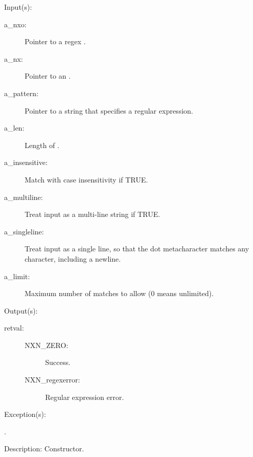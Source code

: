 \begin{capi}
\label{nxo_regex_new}
	\begin{capilist}
	\item[Input(s): ]
		\begin{description}\item[]
		\item[a\_nxo: ]
			Pointer to a regex .
		\item[a\_nx: ]
			Pointer to an .
		\item[a\_pattern: ]
			Pointer to a string that specifies a regular expression.
		\item[a\_len: ]
			Length of .
		\item[a\_insensitive: ]
			Match with case insensitivity if TRUE.
		\item[a\_multiline: ]
			Treat input as a multi-line string if TRUE.
		\item[a\_singleline: ]
			Treat input as a single line, so that the dot
			metacharacter matches any character, including a
			newline.
		\item[a\_limit: ]
			Maximum number of matches to allow (0 means unlimited).
		\end{description}
	\item[Output(s): ]
		\begin{description}\item[]
		\item[retval: ]
			\begin{description}\item[]
			\item[NXN\_ZERO: ] Success.
			\item[NXN\_regexerror: ] Regular expression error.
			\end{description}
		\end{description}
	\item[Exception(s): ]
		\begin{description}\item[]
		\item[.]
		\end{description}
	\item[Description: ]
		Constructor.
	\end{capilist}

\end{capi}
